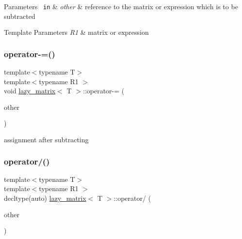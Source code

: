 \begin{DoxyParams}[1]{Parameters}
\mbox{\texttt{ in}}  & {\em other} & reference to the matrix or expression which is to be subtracted\\
\hline
\end{DoxyParams}

\begin{DoxyTemplParams}{Template Parameters}
{\em R1} & matrix or expression \\
\hline
\end{DoxyTemplParams}
\mbox{\label{classlazy__matrix_a9b8a37284dfa4be9423322f409b81c63}} 
\subsubsection{\texorpdfstring{operator-\/=()}{operator-=()}}
{\footnotesize\ttfamily template$<$typename T$>$ \\
template$<$typename R1 $>$ \\
void \mbox{\hyperlink{classlazy__matrix}{lazy\+\_\+matrix}}$<$ T $>$\+::operator-\/= (\begin{DoxyParamCaption}\item[{const R1 \&}]{other }\end{DoxyParamCaption})\hspace{0.3cm}{\ttfamily [inline]}}



assignment after subtracting 

\mbox{\label{classlazy__matrix_ad63bef3225861a4845772934bed6dfa4}} 
\subsubsection{\texorpdfstring{operator/()}{operator/()}}
{\footnotesize\ttfamily template$<$typename T$>$ \\
template$<$typename R1 $>$ \\
decltype(auto) \mbox{\hyperlink{classlazy__matrix}{lazy\+\_\+matrix}}$<$ T $>$\+::operator/ (\begin{DoxyParamCaption}\item[{const R1 \&}]{other }\end{DoxyParamCaption})\hspace{0.3cm}{\ttfamily [inline]}}



